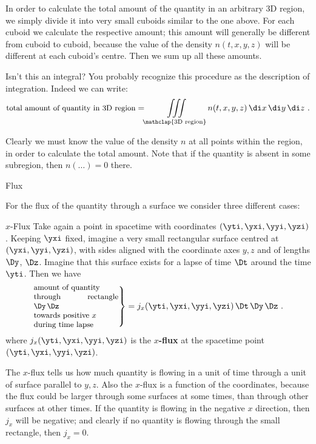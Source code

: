 In order to calculate the total amount of the quantity in an arbitrary 3D region, we simply divide it into very small cuboids similar to the one above. For each cuboid we calculate the respective amount; this amount will generally be different from cuboid to cuboid, because the value of the density $n(t,x,y,z)$ will be different at each cuboid's centre. Then we sum up all these amounts.

\begin{extra}{Isn't this an integral?}
  You probably recognize this procedure as the description of integration. Indeed we can write:
  \begin{equation}
    \label{neq:density_integral}
    \text{\small total amount of quantity in 3D region} =
    \iiint\limits_{\mathclap{\text{3D region}}}n(t,x,y,z)\, \di x\, \di y\, \di z \ .
  \end{equation}
\end{extra}
Clearly we must know the value of the density $n$ at all points within the region, in order to calculate the total amount. Note that if the quantity is absent in some subregion, then $n(\dotso)=0$ there.

\medskip


\begin{warning}
  Flux
\end{warning}

For the flux of the quantity through a surface we consider three different cases:
\begin{definition}{$x$-Flux}
  Take again a point in spacetime with coordinates $(\yti,\yxi,\yyi,\yzi)$. Keeping $\yxi$ fixed, imagine a very small rectangular surface centred at $(\yxi,\yyi,\yzi)$, with sides aligned with the coordinate axes $y,z$ and of lengths $\Dy$, $\Dz$. Imagine that this surface exists for a lapse of time $\Dt$ around the time $\yti$. Then we have
  \begin{equation}
    \label{neq:xflux_expl}
    \left.\parbox[c]{10em}{\small amount of quantity\\ through rectangle $\Dy\,\Dz$\\ towards positive $x$\\during time lapse }\right\} =
    j_{x}(\yti,\yxi,\yyi,\yzi)\, \Dt\, \Dy\, \Dz \ .
  \end{equation}
  where $j_{x}(\yti,\yxi,\yyi,\yzi)$ is the \textbf{$x$-flux} at the spacetime point $(\yti,\yxi,\yyi,\yzi)$.
\end{definition}
The $x$-flux tells us how much quantity is flowing in a unit of time through a unit of surface parallel to $y,z$. Also the $x$-flux is a function of the coordinates, because the flux could be larger through some surfaces at some times, than through other surfaces at other times. If the quantity is flowing in the negative $x$ direction, then $j_{x}$ will be negative; and clearly if no quantity is flowing through the small rectangle, then $j_{x}=0$.

